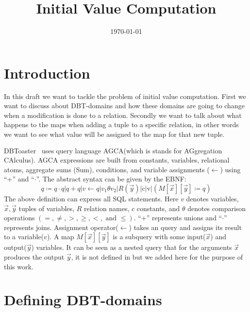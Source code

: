 \documentclass[12pt]{article}
\begin{document}
\newtheorem{theorem}{Theorem}[section]
\newtheorem{corollary}{Corollary}[section]

\title{Initial Value Computation}
\author{}
\date{\today}
\maketitle
\newcommand{\dom}{\textsf{DBT-dom}}
\newcommand{\multip}{\textsf{DBT-multip}}
\newcommand{\InputVars}{\textsf{InputVars}}
\newcommand{\OutputVars}{\textsf{OutputVars}}
\newcommand{\Rel}{\textsf{Rel}}
\newcommand{\Ext}{\textsf{Ext}}
\section{Introduction}

In this draft we want to tackle the problem of initial value computation. First we want to discuss about DBT-domains and how these domains are going to change when a modification is done to a relation. Secondly we want to talk about what happens to the maps when adding a tuple to a specific relation, in other words we want to see what value will be assigned to the map for that new tuple.

DBToaster~\cite{1} uses query language AGCA(which is stands for AGgregation CAlculus). AGCA expressions are built from constants, variables, relational atoms, aggregate sums (Sum), conditions, and variable assignments ($\gets$) using ``+''  and ``$\cdot$''. The abstract syntax can be given by the EBNF:
\begin{equation}
\label{def:agca}
q\coloneqq  q\cdot q | q + q|v \gets q |v_{1}\theta v_{2}|R(\vec{y})|\text{c}|\text{v}|(M[\vec{x}][\vec{y}]\coloneqq q)
\end{equation}
The above definition can express all SQL statements. Here $v$ denotes variables, $\vec{x},\vec{y}$ tuples of variables, $R$ relation names, $c$ constants, and $\theta$ denotes comparison operations $(=,\neq, >, \geq, <, \text{ and }\leq)$.
 ``+'' represents unions and ``$\cdot$'' represents joins. Assignment operator($\gets$) takes an query and assigns its result to a variable($v$). A map $M[\vec{x}][\vec{y}]$ is a subquery with some input($\vec{x}$) and output($\vec{y}$) variables. It can be seen as a nested query that for the arguments $\vec{x}$ produces the output $\vec{y}$, it is not defined in \cite{1} but we added here for the purpose of this work.

\section{Defining DBT-domains}
\label{sec:definingdomains}
\end{document}
